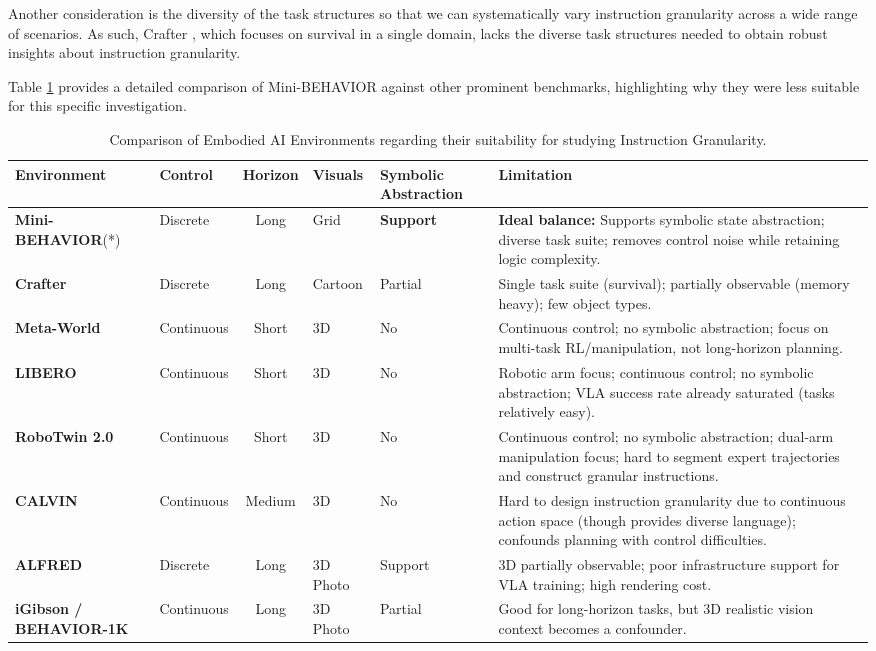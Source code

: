 Another consideration is the diversity of the task structures so that we can systematically vary instruction granularity across a wide range of scenarios. As such, Crafter \citep{hafner2021crafter}, which focuses on survival in a single domain, lacks the diverse task structures needed to obtain robust insights about instruction granularity. 

Table \ref{tab:env_comparison} provides a detailed comparison of Mini-BEHAVIOR against other prominent benchmarks, highlighting why they were less suitable for this specific investigation.

\begin{table}[t]
\small
\centering
\caption{Comparison of Embodied AI Environments regarding their suitability for studying Instruction Granularity.}
\label{tab:env_comparison}
\begin{tabular}{@{}l>{\raggedright\arraybackslash}p{1.4cm}c>{\raggedright\arraybackslash}p{1.5cm}>{\raggedright\arraybackslash}p{1.7cm}>{\raggedright\arraybackslash}p{4.9cm}@{}}
\toprule
\textbf{Environment} & \textbf{Control} & \textbf{Horizon} & \textbf{Visuals} & \textbf{Symbolic Abstraction} & \textbf{Limitation} \\
\midrule
\textbf{Mini-BEHAVIOR}(*) & Discrete & Long & Grid & \textbf{Support} & \textbf{Ideal balance:} Supports symbolic state abstraction; diverse task suite; removes control noise while retaining logic complexity. \\
\textbf{Crafter} & Discrete & Long & Cartoon & Partial & Single task suite (survival); partially observable (memory heavy); few object types. \\
\textbf{Meta-World} & Continuous & Short & 3D & No & Continuous control; no symbolic abstraction; focus on multi-task RL/manipulation, not long-horizon planning. \\
\textbf{LIBERO} & Continuous & Short & 3D & No & Robotic arm focus; continuous control; no symbolic abstraction; VLA success rate already saturated (tasks relatively easy). \\
\textbf{RoboTwin 2.0} & Continuous & Short & 3D & No & Continuous control; no symbolic abstraction; dual-arm manipulation focus; hard to segment expert trajectories and construct granular instructions. \\
\textbf{CALVIN} & Continuous & Medium & 3D & No & Hard to design instruction granularity due to continuous action space (though provides diverse language); confounds planning with control difficulties. \\
\textbf{ALFRED} & Discrete & Long & 3D Photo & Support & 3D partially observable; poor infrastructure support for VLA training; high rendering cost. \\
\textbf{iGibson / BEHAVIOR-1K} & Continuous & Long & 3D Photo & Partial & Good for long-horizon tasks, but 3D realistic vision context becomes a confounder. \\
\bottomrule
\end{tabular}%
\end{table}

